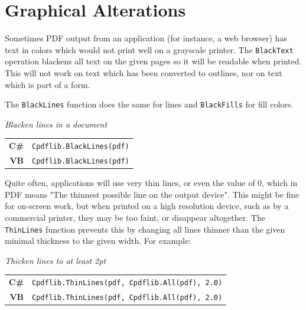 \documentclass[a4paper]{memoir}
\begin{document}
\section{Graphical Alterations}

Sometimes PDF output from an application (for instance, a web browser) has text
in colors which would not print well on a grayscale printer. The
\verb!BlackText! operation blackens all text on the given pages so it will be
readable when printed. This will not work on text which has been converted to
outlines, nor on text which is part of a form.

The \verb!BlackLines! function does the same for lines and \verb!BlackFills!
for fill colors.

\begin{framed}
\noindent\textit{Blacken lines in a document}

\vspace{2mm}
\noindent\begin{tabular}{rl}
\small\sffamily\textbf{C\#} &
\begin{minipage}{4in}
\small\verb!Cpdflib.BlackLines(pdf)!
\end{minipage}\\[5mm]
\small\sffamily\textbf{VB} &
\begin{minipage}{4in}
\small\verb!Cpdflib.BlackLines(pdf)!
\end{minipage}\\[5mm]
\end{tabular}
\end{framed}

Quite often, applications will use very thin lines, or even the value of 0,
which in PDF means "The thinnest possible line on the output device". This
might be fine for on-screen work, but when printed on a high resolution device,
such as by a commercial printer, they may be too faint, or disappear
altogether. The \verb!ThinLines! function prevents this by changing all lines
thinner than the given minimal thickness to the given width. For example:

\begin{framed}
\noindent\textit{Thicken lines to at least 2pt}

\vspace{2mm}
\noindent\begin{tabular}{rl}
\small\sffamily\textbf{C\#} &
\begin{minipage}{4in}
\small\verb!Cpdflib.ThinLines(pdf, Cpdflib.All(pdf), 2.0)!
\end{minipage}\\[5mm]
\small\sffamily\textbf{VB} &
\begin{minipage}{4in}
\small\verb!Cpdflib.ThinLines(pdf, Cpdflib.All(pdf), 2.0)!
\end{minipage}\\[5mm]
\end{tabular}
\end{framed}
\end{document}

